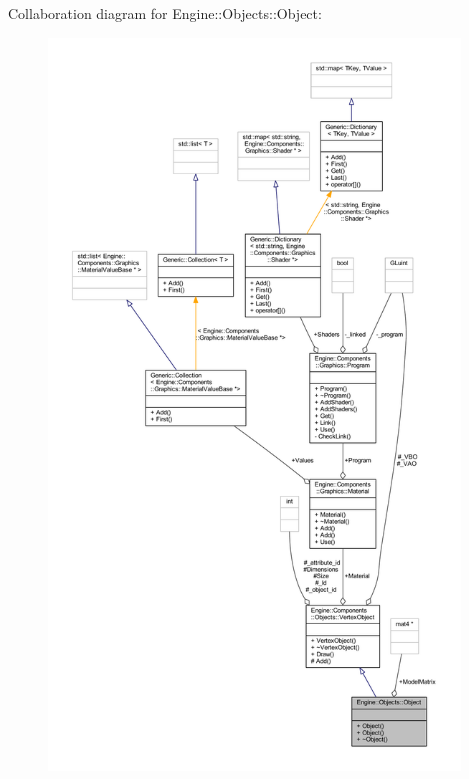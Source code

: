 Collaboration diagram for Engine\+:\+:Objects\+:\+:Object\+:
\nopagebreak
\begin{figure}[H]
\begin{center}
\leavevmode
\includegraphics[height=550pt]{classEngine_1_1Objects_1_1Object__coll__graph}
\end{center}
\end{figure}
